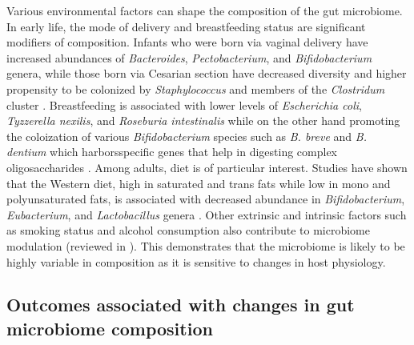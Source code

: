 Various environmental factors can shape the composition of the gut microbiome. In early life, the mode of delivery and breastfeeding status are significant modifiers of composition. Infants who were born via vaginal delivery have increased abundances of \emph{Bacteroides}, \emph{Pectobacterium}, and \emph{Bifidobacterium} genera, while those born via Cesarian section have decreased diversity and higher propensity to be colonized by \emph{Staphylococcus} and members of the \emph{Clostridum} cluster \cite{madan2016effects, kim2020delayed, stewart2018temporal}. Breastfeeding is associated with lower levels of \emph{Escherichia coli}, \emph{Tyzzerella nexilis}, and \emph{Roseburia intestinalis} while on the other hand promoting the coloization of various \emph{Bifidobacterium} species such as \emph{B. breve} and \emph{B. dentium} which harborsspecific genes that help in digesting complex oligosaccharides \cite{stewart2018temporal, vatanen2018human}. Among adults, diet is of particular interest. Studies have shown that the Western diet, high in saturated and trans fats while low in mono and polyunsaturated fats, is associated with decreased abundance in \emph{Bifidobacterium}, \emph{Eubacterium}, and \emph{Lactobacillus} genera \cite{wu2011linking}. Other extrinsic and intrinsic factors such as smoking status \cite{biedermann2013smoking} and alcohol consumption \cite{dubinkina2017links} also contribute to microbiome modulation (reviewed in \cite{schmidt2018humana}). This demonstrates that the microbiome is likely to be highly variable in composition as it is sensitive to changes in host physiology. 

\subsection{Outcomes associated with changes in gut microbiome composition}

